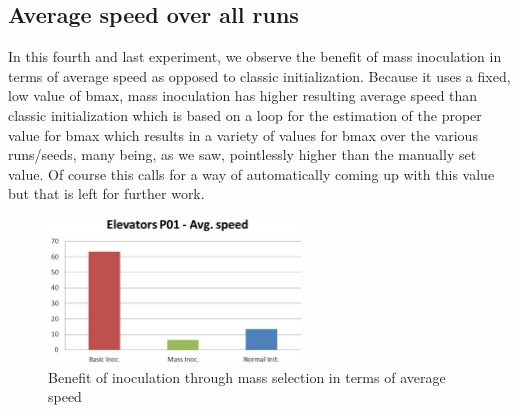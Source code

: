\documentclass[english]{DESCARWINreport}
\begin{document}
\subsection{Average speed over all runs}

In this fourth and last experiment, we observe the benefit of mass inoculation in terms of average speed as opposed to classic initialization. Because it uses a fixed, low value of bmax, mass inoculation has higher resulting average speed than classic initialization which is based on a loop for the estimation of the proper value for bmax which results in a variety of values for bmax over the various runs/seeds, many being, as we saw, pointlessly higher than the manually set value. Of course this calls for a way of automatically coming up with this value but that is left for further work.

\begin{figure}
	\centering
		\includegraphics[width=0.6\textwidth]{pics/speed_elevators.eps}
	\caption{Benefit of inoculation through mass selection in terms of average speed}
	\label{fig:bmax2}
\end{figure}





\end{document}
